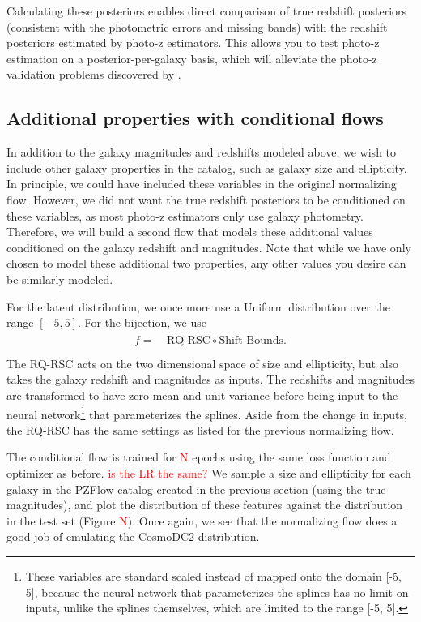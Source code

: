 \documentclass[twocolumn]{aastex631}
\newcommand{\note}[1]{\textsf{\textcolor{red}{#1}}}
\begin{document}
Calculating these posteriors enables direct comparison of true redshift posteriors (consistent with the photometric errors and missing bands) with the redshift posteriors estimated by photo-z estimators.
This allows you to test photo-z estimation on a posterior-per-galaxy basis, which will alleviate the photo-z validation problems discovered by \citet{schmidt2020}.


\subsection{Additional properties with conditional flows}
\label{sec:fwd-model-condtional}

In addition to the galaxy magnitudes and redshifts modeled above, we wish to include other galaxy properties in the catalog, such as galaxy size and ellipticity.
In principle, we could have included these variables in the original normalizing flow.
However, we did not want the true redshift posteriors to be conditioned on these variables, as most photo-z estimators only use galaxy photometry.
Therefore, we will build a second flow that models these additional values conditioned on the galaxy redshift and magnitudes.
Note that while we have only chosen to model these additional two properties, any other values you desire can be similarly modeled.

For the latent distribution, we once more use a Uniform distribution over the range $[-5, 5]$.
For the bijection, we use
\begin{align}
    \begin{split}
        f =& ~ \text{RQ-RSC} \circ \text{Shift Bounds}. \\
    \end{split}
\end{align}
The RQ-RSC acts on the two dimensional space of size and ellipticity, but also takes the galaxy redshift and magnitudes as inputs.
The redshifts and magnitudes are transformed to have zero mean and unit variance before being input to the neural network\footnote{These variables are standard scaled instead of mapped onto the domain [-5, 5], because the neural network that parameterizes the splines has no limit on inputs, unlike the splines themselves, which are limited to the range [-5, 5].} that parameterizes the splines.
Aside from the change in inputs, the RQ-RSC has the same settings as listed for the previous normalizing flow.

The conditional flow is trained for \note{N} epochs using the same loss function and optimizer as before.
\note{is the LR the same?}
We sample a size and ellipticity for each galaxy in the PZFlow catalog created in the previous section (using the true magnitudes), and plot the distribution of these features against the distribution in the test set (Figure \note{N}).
Once again, we see that the normalizing flow does a good job of emulating the CosmoDC2 distribution.
\end{document}
